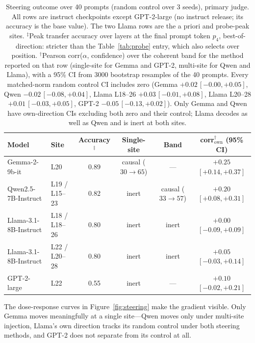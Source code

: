 \documentclass{article}
\begin{document}
\begin{table}[h]
    \centering
    \begin{tabular}{llcccc}
        \toprule
        Model & Site & Accuracy$^\ddagger$ & Single-site & Band & corr$^\dagger_{\text{own}}$ (95\% CI) \\
        \midrule
        Gemma-2-9b-it         & L20              & 0.89 & causal ($30\!\to\!65$) & ---                    & $+0.25$ $[+0.14, +0.37]$ \\
        Qwen2.5-7B-Instruct   & L19 / L15--23    & 0.82 & inert                  & causal ($33\!\to\!57$) & $+0.20$ $[+0.08, +0.31]$ \\
        Llama-3.1-8B-Instruct & L18 / L18--26    & 0.80 & inert                  & inert                  & $+0.00$ $[-0.09, +0.09]$ \\
        Llama-3.1-8B-Instruct & L22 / L20--28    & 0.80 & inert                  & inert                  & $+0.05$ $[-0.03, +0.14]$ \\
        GPT-2-large           & L22              & 0.55 & inert                  & ---                    & $+0.10$ $[-0.02, +0.21]$ \\
        \bottomrule
    \end{tabular}
    \caption{Steering outcome over 40 prompts (random control over 3 seeds), primary judge. All rows are instruct checkpoints except GPT-2-large (no instruct release; its accuracy is the base value). The two Llama rows are the a priori and probe-peak sites. $^\ddagger$Peak transfer accuracy over layers at the final prompt token $p_4$, best-of-direction: stricter than the Table~\ref{tab:probe} entry, which also selects over position. $^\dagger$Pearson corr($\alpha$, confidence) over the coherent band for the method reported on that row (single-site for Gemma and GPT-2, multi-site for Qwen and Llama), with a 95\% CI from $3000$ bootstrap resamples of the 40 prompts. Every matched-norm random control CI includes zero (Gemma $+0.02\,[-0.00,+0.05]$, Qwen $-0.02\,[-0.08,+0.04]$, Llama L18--26 $+0.03\,[-0.01,+0.08]$, Llama L20--28 $+0.01\,[-0.03,+0.05]$, GPT-2 $-0.05\,[-0.13,+0.02]$). Only Gemma and Qwen have own-direction CIs excluding both zero and their control; Llama decodes as well as Qwen and is inert at both sites.}
    \label{tab:steer}
\end{table}

The dose-response curves in Figure~\ref{fig:steering} make the gradient visible. Only Gemma moves meaningfully at a single site---Qwen moves only under multi-site injection, Llama's own direction tracks its random control under both steering methods, and GPT-2 does not separate from its control at all.
\end{document}
